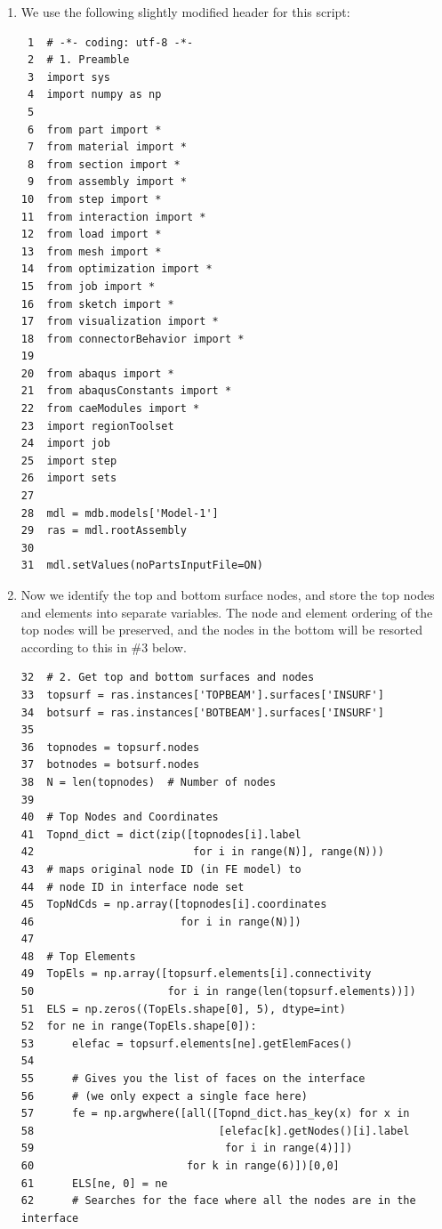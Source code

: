 \documentclass[11pt]{article}
\begin{document}
\begin{enumerate}
\item We use the following slightly modified header for this script:
\begin{verbatim}
 1  # -*- coding: utf-8 -*-
 2  # 1. Preamble
 3  import sys
 4  import numpy as np
 5  
 6  from part import *
 7  from material import *
 8  from section import *
 9  from assembly import *
10  from step import *
11  from interaction import *
12  from load import *
13  from mesh import *
14  from optimization import *
15  from job import *
16  from sketch import *
17  from visualization import *
18  from connectorBehavior import *
19  
20  from abaqus import *
21  from abaqusConstants import *
22  from caeModules import * 
23  import regionToolset
24  import job
25  import step
26  import sets
27  
28  mdl = mdb.models['Model-1']
29  ras = mdl.rootAssembly
30  
31  mdl.setValues(noPartsInputFile=ON)
\end{verbatim}
\item Now we identify the top and bottom surface nodes, and store the top nodes and elements into separate variables.
The node and element ordering of the top nodes will be preserved, and the nodes in the bottom will be resorted according to this in \#3 below.
\begin{verbatim}
32  # 2. Get top and bottom surfaces and nodes
33  topsurf = ras.instances['TOPBEAM'].surfaces['INSURF']
34  botsurf = ras.instances['BOTBEAM'].surfaces['INSURF']
35  
36  topnodes = topsurf.nodes
37  botnodes = botsurf.nodes
38  N = len(topnodes)  # Number of nodes
39  
40  # Top Nodes and Coordinates
41  Topnd_dict = dict(zip([topnodes[i].label
42                         for i in range(N)], range(N)))
43  # maps original node ID (in FE model) to
44  # node ID in interface node set
45  TopNdCds = np.array([topnodes[i].coordinates
46                       for i in range(N)])
47  
48  # Top Elements
49  TopEls = np.array([topsurf.elements[i].connectivity
50                     for i in range(len(topsurf.elements))])
51  ELS = np.zeros((TopEls.shape[0], 5), dtype=int)
52  for ne in range(TopEls.shape[0]):
53      elefac = topsurf.elements[ne].getElemFaces()
54  
55      # Gives you the list of faces on the interface
56      # (we only expect a single face here)
57      fe = np.argwhere([all([Topnd_dict.has_key(x) for x in 
58                             [elefac[k].getNodes()[i].label
59                              for i in range(4)]])
60                        for k in range(6)])[0,0]
61      ELS[ne, 0] = ne
62      # Searches for the face where all the nodes are in the interface

\end{verbatim}
\end{enumerate}
\end{document}
